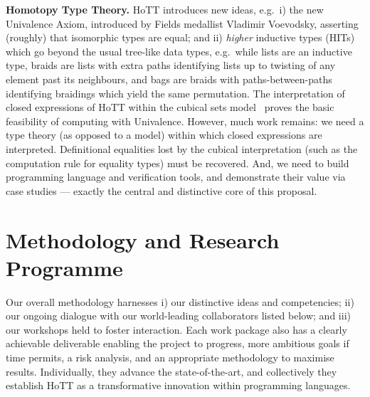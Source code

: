 \documentclass[a4paper,11pt]{article}
\newcommand{\eg}{{e.g.}\ }
\begin{document}
{\bf Homotopy Type Theory.} HoTT introduces new ideas, \eg i) the new
Univalence Axiom, introduced by Fields medallist Vladimir Voevodsky,
asserting (roughly) that isomorphic types are equal; and ii)
\emph{higher} inductive types (HITs) which go beyond the usual
tree-like data types, \eg while lists are an inductive type, braids
are lists with extra paths identifying lists up to twisting of any
element past its neighbours, and bags are braids with
paths-between-paths identifying braidings which yield the same
permutation.  The interpretation of closed expressions of HoTT within
the cubical sets model~\cite{BezemM:cubsmt, nominal} proves the basic
feasibility of computing with Univalence.  However, much work remains:
we need a type theory (as opposed to a model) within which closed
expressions are interpreted.  Definitional equalities lost by the
cubical interpretation (such as the computation rule for equality
types) must be recovered. And, we need to build programming
language and verification tools, and demonstrate their value via case
studies --- exactly the central and distinctive core of this proposal.

\vspace*{-0.2in}

\section{Methodology and Research Programme}
\vspace*{-0.1in}
Our overall methodology harnesses i) our distinctive ideas and
competencies; ii) our ongoing dialogue with our world-leading
collaborators listed below; and iii) our workshops held to foster
interaction. Each work package also has a clearly achievable
deliverable enabling the project to progress, more ambitious goals if
time permits, a risk analysis, and an appropriate methodology to
maximise results. Individually, they advance the state-of-the-art, and
collectively they establish HoTT as a transformative innovation within
programming languages.
\end{document}
